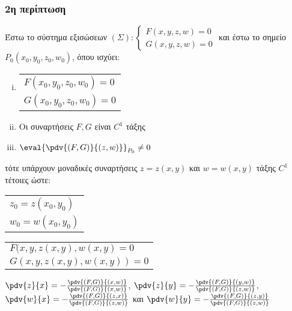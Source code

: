 \subsubsection{2η περίπτωση}

Έστω το σύστημα εξισώσεων $(\Sigma):
\begin{cases}
  F(x,y,z,w) = 0  \\
  G(x,y,z,w) = 0
\end{cases}$
και έστω το σημείο $ P_0(x_0,y_0,z_0,w_0) $, όπου ισχύει:
\begin{enumerate}[(i)]
  \item  \begin{tabular}{l}
      $F(x_0,y_0,z_0,w_0) = 0$ \\
      $G(x_0,y_0,z_0,w_0) = 0$
    \end{tabular}
  \item Οι συναρτήσεις $ F, G $ είναι $ C^{1} $ τάξης 
  \item $ \eval{\pdv{(F,G)}{(z,w)}}_{P_0} \neq 0 $ 
\end{enumerate}
τότε υπάρχουν μοναδικές συναρτήσεις $ z = z(x,y) $ και $ w = w(x,y) $ τάξης 
$ C^{1} $ τέτοιες ώστε:
\begin{myitemize}
  \item \begin{tabular}{l}
      $ z_0 = z(x_0,y_0) $ \\
      $ w_0 = w(x_0,y_0) $
    \end{tabular}
  \item \begin{tabular}{l}
      $ F(x,y,z(x,y), w(x,y) = 0 $ \\
      $ G(x,y,z(x,y), w(x,y)) = 0 $
    \end{tabular}
  \item $ \pdv{z}{x} = - \frac{\pdv{(F,G)}{(x,w)}}{\pdv{(F,G)}{(x,w)}} $, 
    \; $ \pdv{z}{y} = - \frac{\pdv{(F,G)}{(y,w)}}{\pdv{(F,G)}{(z,w)}} $, 
    \; $ \pdv{w}{x} = - \frac{\pdv{(F,G)}{(z,x)}}{\pdv{(F,G)}{(z,w)}} $ και 
    $ \pdv{w}{y} = - \frac{\pdv{(F,G)}{(z,y)}}{\pdv{(F,G)}{(z,w)}} $
\end{myitemize}


